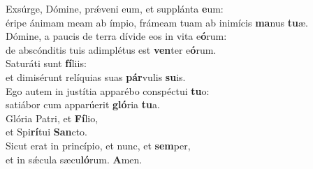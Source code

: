 \evenverse Exsúrge, Dómine, prǽveni eum, et supplánta \textbf{e}um:~\*\\
\evenverse éripe ánimam meam ab ímpio, frámeam tuam ab inimícis \textbf{ma}nus \textbf{tu}æ.\\
\oddverse Dómine, a paucis de terra dívide eos in vita e\textbf{ó}rum:~\*\\
\oddverse de abscónditis tuis adimplétus est \textbf{ven}ter e\textbf{ó}rum.\\
\evenverse Saturáti sunt \textbf{fí}liis:~\*\\
\evenverse et dimisérunt relíquias suas \textbf{pár}vulis \textbf{su}is.\\
\oddverse Ego autem in justítia apparébo conspéctui \textbf{tu}o:~\*\\
\oddverse satiábor cum apparúerit \textbf{gló}ria \textbf{tu}a.\\
\evenverse Glória Patri, et \textbf{Fí}lio,~\*\\
\evenverse et Spi\textbf{rí}tui \textbf{San}cto.\\
\oddverse Sicut erat in princípio, et nunc, et \textbf{sem}per,~\*\\
\oddverse et in sǽcula sæcu\textbf{ló}rum. \textbf{A}men.\\
